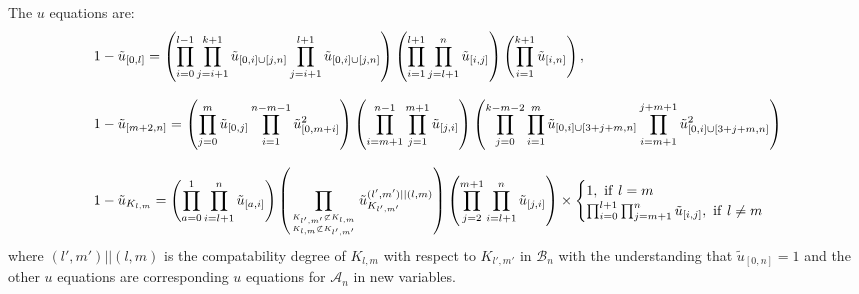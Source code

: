 \documentclass[hidelinks,12pt]{article}
\begin{document}
The $u$ equations are:
\begin{align*}
&1-\tilde u_{[0,l]}=\left(\prod_{i=0}^{l-1} \prod_{j=i+1}^{k+1}  \tilde u_{[0,i]\cup [j,n]} \prod_{j=i+1}^{l+1} \tilde u_{[0,i]\cup [j,n]}\right) \left(\prod_{i=1}^{l+1} \prod_{j=l+1}^{n}\tilde u_{[i,j]} \right) \left(\prod_{i=1}^{k+1} \tilde u_{[i,n]} \right),\\[2ex]
&1-\tilde u_{[m+2,n]}=\left( \prod_{j=0}^{m}\tilde u_{[0,j]} \prod_{i=1}^{n-m-1}\tilde u_{[0,m+i]}^2 \right) \left( \prod_{i=m+1}^{n-1}\prod_{j=1}^{m+1}\tilde u_{[j,i]} \right) \left(\prod_{j=0}^{k-m-2} \prod_{i=1}^{m} \tilde u_{[0,i]\cup [3+j+m, n]} \prod_{i= m+1}^{j+m+1} \tilde u_{[0,i]\cup [3+j+m,n]}^2 \right) \\[2ex]
&1-\tilde u_{K_{l,m}}=\left(\prod_{a=0}^1\prod_{i=l+1}^{n}\tilde u_{[a,i]}\right) \left(\prod_{{\tiny {K_{l',m'} \not\subset K_{l,m}}\atop{K_{l,m} \not\subset K_{l',m'}} }} \tilde u_{K_{l',m'}}^{(l',m')||(l,m)}\right)\left(\prod_{j=2}^{m+1} \prod_{i=l+1}^{n} \tilde u_{[j,i]} \right)\times 
\begin{cases}
 1, ~{\rm if} ~ l=m  \\
 \prod_{i=0}^{l+1} \prod_{j=m+1}^n \tilde u_{[i,j]},~ {\rm if}~l \neq m
\end{cases}
\end{align*}
where $(l',m')||(l,m)$ is the compatability degree of $K_{l,m}$ with respect to $K_{l',m'}$ in $\mathscr B_n$ with the understanding that $\tilde u_{[0,n]}=1$ and the other $u$ equations are corresponding $u$ equations for $\mathscr A_n$ in new variables.



\end{document}
